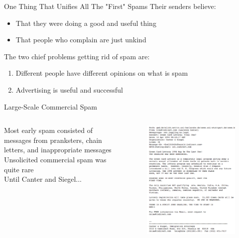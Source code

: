 \documentclass[nobackground,dvipsnames,table,aspectratio=169]{beamer}
\begin{document}
\begin{frame}{One Thing That Unifies All The "First" Spams}
    Their senders believe:\\
    \begin{itemize}
        \item That they were doing a good and useful thing
        \item That people who complain are just unkind
    \end{itemize}
    The two chief problems getting rid of spam are:\\
    \begin{enumerate}
        \item Different people have different opinions on what is spam
        \item Advertising is useful and successful 
    \end{enumerate}
\end{frame}

\begin{frame}{Large-Scale Commercial Spam}
    \begin{columns}
            Most early spam consisted of messages from pranksters, chain letters, and inappropriate messages\\
            Unsolicited commercial spam was quite rare\\
            Until Canter and Siegel...
            \begin{figure}
                \centering
                \includegraphics[width=\textwidth]{canter-and-siegel}
            \end{figure}
    \end{columns}
\end{frame}
\end{document}
